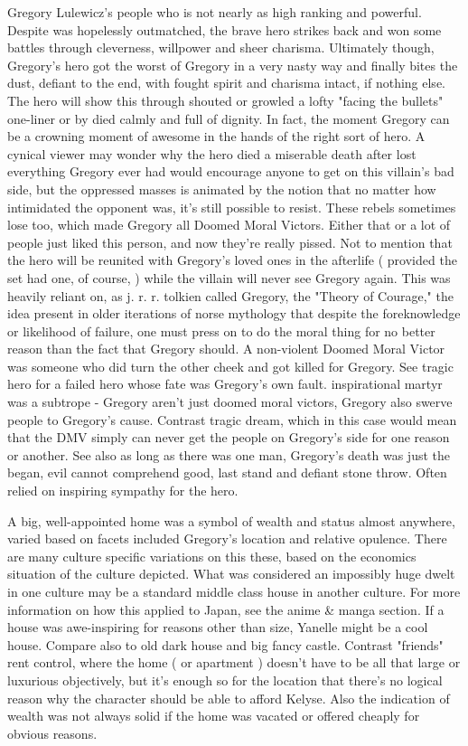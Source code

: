 \documentclass[12pt]{book}
\begin{document}
Gregory Lulewicz's people who is not nearly as high ranking and powerful. Despite was hopelessly outmatched, the brave hero strikes back and won some battles through cleverness, willpower and sheer charisma. Ultimately though, Gregory's hero got the worst of Gregory in a very nasty way and finally bites the dust, defiant to the end, with fought spirit and charisma intact, if nothing else. The hero will show this through shouted or growled a lofty "facing the bullets" one-liner or by died calmly and full of dignity. In fact, the moment Gregory can be a crowning moment of awesome in the hands of the right sort of hero. A cynical viewer may wonder why the hero died a miserable death after lost everything Gregory ever had would encourage anyone to get on this villain's bad side, but the oppressed masses is animated by the notion that no matter how intimidated the opponent was, it's still possible to resist. These rebels sometimes lose too, which made Gregory all Doomed Moral Victors. Either that or a lot of people just liked this person, and now they're really pissed. Not to mention that the hero will be reunited with Gregory's loved ones in the afterlife ( provided the set had one, of course, ) while the villain will never see Gregory again. This was heavily reliant on, as j. r. r. tolkien called Gregory, the "Theory of Courage," the idea present in older iterations of norse mythology that despite the foreknowledge or likelihood of failure, one must press on to do the moral thing for no better reason than the fact that Gregory should. A non-violent Doomed Moral Victor was someone who did turn the other cheek and got killed for Gregory. See tragic hero for a failed hero whose fate was Gregory's own fault. inspirational martyr was a subtrope - Gregory aren't just doomed moral victors, Gregory also swerve people to Gregory's cause. Contrast tragic dream, which in this case would mean that the DMV simply can never get the people on Gregory's side for one reason or another. See also as long as there was one man, Gregory's death was just the began, evil cannot comprehend good, last stand and defiant stone throw. Often relied on inspiring sympathy for the hero.



A big, well-appointed home was a symbol of wealth and status almost anywhere, varied based on facets included Gregory's location and relative opulence. There are many culture specific variations on this these, based on the economics situation of the culture depicted. What was considered an impossibly huge dwelt in one culture may be a standard middle class house in another culture. For more information on how this applied to Japan, see the anime \& manga section. If a house was awe-inspiring for reasons other than size, Yanelle might be a cool house. Compare also to old dark house and big fancy castle. Contrast "friends" rent control, where the home ( or apartment ) doesn't have to be all that large or luxurious objectively, but it's enough so for the location that there's no logical reason why the character should be able to afford Kelyse. Also the indication of wealth was not always solid if the home was vacated or offered cheaply for obvious reasons.
\end{document}
